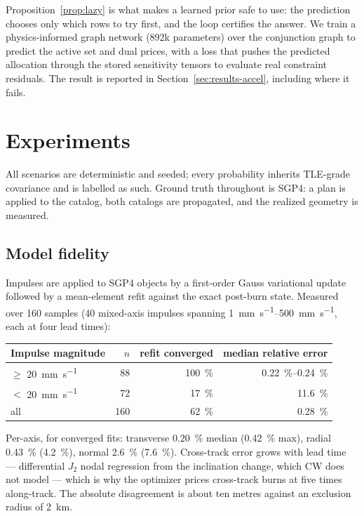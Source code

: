 \documentclass[11pt]{article}
\theoremstyle{definition}
\theoremstyle{remark}
\begin{document}
Proposition~\ref{prop:lazy} is what makes a learned prior safe to use: the
prediction chooses only which rows to try first, and the loop certifies the
answer. We train a physics-informed graph network (\num{892}k parameters) over
the conjunction graph to predict the active set and dual prices, with a loss
that pushes the predicted allocation through the stored sensitivity tensors to
evaluate real constraint residuals. The result is reported in
Section~\ref{sec:results-accel}, including where it fails.

\section{Experiments}
\label{sec:experiments}

All scenarios are deterministic and seeded; every probability inherits
TLE-grade covariance and is labelled as such. Ground truth throughout is SGP4:
a plan is applied to the catalog, both catalogs are propagated, and the
realized geometry is measured.

\subsection{Model fidelity}
\label{sec:fidelity}

Impulses are applied to SGP4 objects by a first-order Gauss variational update
followed by a mean-element refit against the exact post-burn state. Measured
over 160 samples (40 mixed-axis impulses spanning
\SIrange{1}{500}{\milli\meter\per\second}, each at four lead times):

\begin{center}
\begin{tabular}{lrrr}
\toprule
Impulse magnitude & $n$ & refit converged & median relative error \\
\midrule
$\ge$ \SI{20}{\milli\meter\per\second} & 88 & \SI{100}{\percent} & \SIrange{0.22}{0.24}{\percent} \\
$<$ \SI{20}{\milli\meter\per\second} & 72 & \SI{17}{\percent} & \SI{11.6}{\percent} \\
all & 160 & \SI{62}{\percent} & \SI{0.28}{\percent} \\
\bottomrule
\end{tabular}
\end{center}

Per-axis, for converged fits: transverse \SI{0.20}{\percent} median
(\SI{0.42}{\percent} max), radial \SI{0.43}{\percent} (\SI{4.2}{\percent}),
normal \SI{2.6}{\percent} (\SI{7.6}{\percent}). Cross-track error grows with
lead time --- differential $J_2$ nodal regression from the inclination change,
which CW does not model --- which is why the optimizer prices cross-track burns
at five times along-track. The absolute disagreement is about ten metres
against an exclusion radius of \SI{2}{\kilo\meter}.
\end{document}
